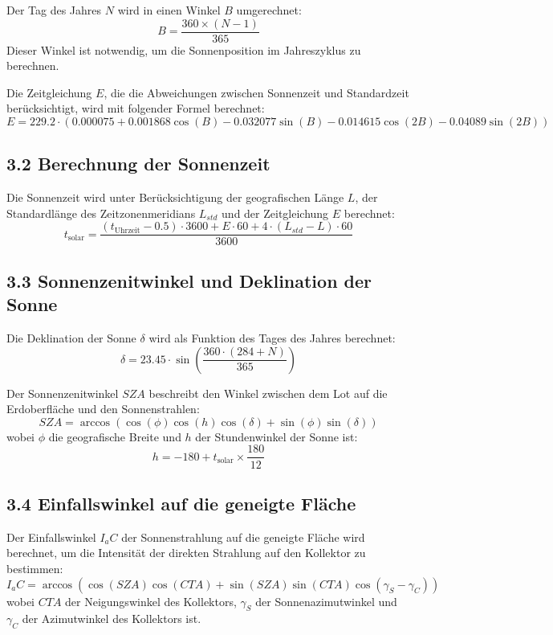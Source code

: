 \documentclass{article}
\begin{document}
Der Tag des Jahres \( N \) wird in einen Winkel \( B \) umgerechnet:
\[
B = \frac{360 \times (N - 1)}{365}
\]
Dieser Winkel ist notwendig, um die Sonnenposition im Jahreszyklus zu berechnen.

Die Zeitgleichung \( E \), die die Abweichungen zwischen Sonnenzeit und Standardzeit berücksichtigt, wird mit folgender Formel berechnet:
\[
E = 229.2 \cdot \left( 0.000075 + 0.001868 \cos(B) - 0.032077 \sin(B) - 0.014615 \cos(2B) - 0.04089 \sin(2B) \right)
\]

\subsection*{3.2 Berechnung der Sonnenzeit}

Die Sonnenzeit wird unter Berücksichtigung der geografischen Länge \( L \), der Standardlänge des Zeitzonenmeridians \( L_{std} \) und der Zeitgleichung \( E \) berechnet:
\[
t_{\text{solar}} = \frac{(t_{\text{Uhrzeit}} - 0.5) \cdot 3600 + E \cdot 60 + 4 \cdot (L_{std} - L) \cdot 60}{3600}
\]

\subsection*{3.3 Sonnenzenitwinkel und Deklination der Sonne}

Die Deklination der Sonne \( \delta \) wird als Funktion des Tages des Jahres berechnet:
\[
\delta = 23.45 \cdot \sin\left( \frac{360 \cdot (284 + N)}{365} \right)
\]

Der Sonnenzenitwinkel \( SZA \) beschreibt den Winkel zwischen dem Lot auf die Erdoberfläche und den Sonnenstrahlen:
\[
SZA = \arccos\left( \cos(\phi) \cos(h) \cos(\delta) + \sin(\phi) \sin(\delta) \right)
\]
wobei \( \phi \) die geografische Breite und \( h \) der Stundenwinkel der Sonne ist:
\[
h = -180 + t_{\text{solar}} \times \frac{180}{12}
\]

\subsection*{3.4 Einfallswinkel auf die geneigte Fläche}

Der Einfallswinkel \( I_aC \) der Sonnenstrahlung auf die geneigte Fläche wird berechnet, um die Intensität der direkten Strahlung auf den Kollektor zu bestimmen:
\[
I_aC = \arccos\left( \cos(SZA) \cos(CTA) + \sin(SZA) \sin(CTA) \cos(\gamma_S - \gamma_C) \right)
\]
wobei \( CTA \) der Neigungswinkel des Kollektors, \( \gamma_S \) der Sonnenazimutwinkel und \( \gamma_C \) der Azimutwinkel des Kollektors ist.
\end{document}
